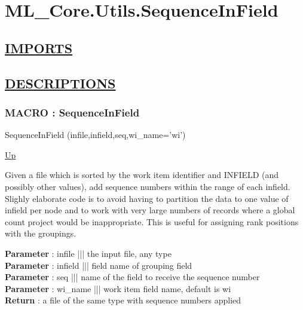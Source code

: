 \chapter*{ML\_Core.Utils.SequenceInField}
\hypertarget{ecldoc:toc:ML_Core.Utils.SequenceInField}{}

\section*{\underline{IMPORTS}}

\section*{\underline{DESCRIPTIONS}}
\subsection*{MACRO : SequenceInField}
\hypertarget{ecldoc:ml_core.utils.sequenceinfield}{}
\begin{minipage}[t]{\textwidth}
\begin{flushleft}
 SequenceInField (infile,infield,seq,wi\_name='wi')
\end{flushleft}
\end{minipage}
\hyperlink{ecldoc:toc:ML_Core/Utils}{Up}

\par
Given a file which is sorted by the work item identifier and INFIELD (and possibly other values), add sequence numbers within the range of each infield. Slighly elaborate code is to avoid having to partition the data to one value of infield per node and to work with very large numbers of records where a global count project would be inappropriate. This is useful for assigning rank positions with the groupings.
\par
\textbf{Parameter} : infile ||| the input file, any type \\
\textbf{Parameter} : infield ||| field name of grouping field \\
\textbf{Parameter} : seq ||| name of the field to receive the sequence number \\
\textbf{Parameter} : wi\_name ||| work item field name, default is wi \\
\textbf{Return} : a file of the same type with sequence numbers applied \\
